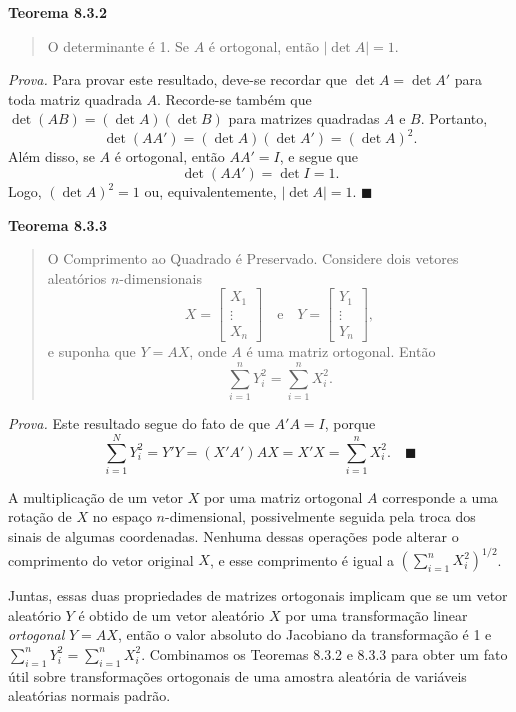 \vspace{1em}
\noindent\textbf{Teorema 8.3.2}
\begin{quote}
    O determinante é 1. Se $A$ é ortogonal, então $|\det A|=1$.
\end{quote}
\vspace{1em}
\noindent\textit{Prova.} Para provar este resultado, deve-se recordar que $\det A = \det A'$ para toda matriz quadrada $A$. Recorde-se também que $\det(AB) = (\det A)(\det B)$ para matrizes quadradas $A$ e $B$. Portanto,
$$
\det(AA') = (\det A)(\det A') = (\det A)^2.
$$
Além disso, se $A$ é ortogonal, então $AA'=I$, e segue que
$$
\det(AA') = \det I = 1.
$$
Logo, $(\det A)^2 = 1$ ou, equivalentemente, $|\det A|=1$. \hfill $\blacksquare$

\vspace{1em}
\noindent\textbf{Teorema 8.3.3}
\begin{quote}
    O Comprimento ao Quadrado é Preservado. Considere dois vetores aleatórios $n$-dimensionais
    $$
    X = \begin{bmatrix} X_1 \\ \vdots \\ X_n \end{bmatrix} \quad \text{e} \quad Y = \begin{bmatrix} Y_1 \\ \vdots \\ Y_n \end{bmatrix},
    $$
    e suponha que $Y=AX$, onde $A$ é uma matriz ortogonal. Então
    $$
    \sum_{i=1}^{n} Y_i^2 = \sum_{i=1}^{n} X_i^2.
    $$
\end{quote}
\vspace{1em}
\noindent\textit{Prova.} Este resultado segue do fato de que $A'A=I$, porque
$$
\sum_{i=1}^{N} Y_i^2 = Y'Y = (X'A')AX = X'X = \sum_{i=1}^{n} X_i^2. \quad \blacksquare
$$

A multiplicação de um vetor $X$ por uma matriz ortogonal $A$ corresponde a uma rotação de $X$ no espaço $n$-dimensional, possivelmente seguida pela troca dos sinais de algumas coordenadas. Nenhuma dessas operações pode alterar o comprimento do vetor original $X$, e esse comprimento é igual a $(\sum_{i=1}^n X_i^2)^{1/2}$.

Juntas, essas duas propriedades de matrizes ortogonais implicam que se um vetor aleatório $Y$ é obtido de um vetor aleatório $X$ por uma transformação linear \textit{ortogonal} $Y=AX$, então o valor absoluto do Jacobiano da transformação é 1 e $\sum_{i=1}^n Y_i^2 = \sum_{i=1}^n X_i^2$. Combinamos os Teoremas 8.3.2 e 8.3.3 para obter um fato útil sobre transformações ortogonais de uma amostra aleatória de variáveis aleatórias normais padrão.

